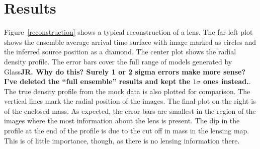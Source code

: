 \documentclass[galley,usenatbib]{mn2e}
\newcommand{\Glass}{{\sc Glass}}
\newcommand{\figref}[1] {Figure~\ref{#1}}
\begin{document}
\section{Results}\label{sec:results}
\figref{reconstruction} shows a typical reconstruction of a
lens. The far left plot shows the ensemble average arrival time surface with
image marked as circles and the inferred source position as a diamond. The
center plot shows the radial density profile. The error bars cover the full
range of models generated by \Glass {\bf JR. Why do this? Surely 1 or 2 sigma
errors make more sense? I've deleted the ``full ensemble'' results and kept the
$1\sigma$ ones instead.}. The true density profile from the mock data is also
plotted for comparison. The vertical lines mark the radial position of the
images. The final plot on the right is of the enclosed mass. As expected, the
error bars are smallest in the region of the images where the most information
about the lens is present. The dip in the profile at the end of the profile is
due to the cut off in mass in the lensing map. This is of little importance,
though, as there is no lensing information there.
\end{document}
